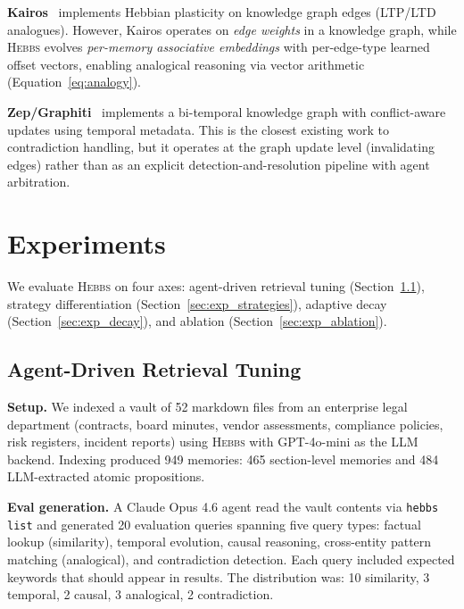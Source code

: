 \documentclass{article}
\begin{document}
\textbf{Kairos}~\citep{kairos} implements Hebbian plasticity on knowledge graph edges (LTP/LTD analogues). However, Kairos operates on \emph{edge weights} in a knowledge graph, while \textsc{Hebbs} evolves \emph{per-memory associative embeddings} with per-edge-type learned offset vectors, enabling analogical reasoning via vector arithmetic (Equation~\ref{eq:analogy}).

\textbf{Zep/Graphiti}~\citep{zep} implements a bi-temporal knowledge graph with conflict-aware updates using temporal metadata. This is the closest existing work to contradiction handling, but it operates at the graph update level (invalidating edges) rather than as an explicit detection-and-resolution pipeline with agent arbitration.

\section{Experiments}
\label{sec:experiments}

We evaluate \textsc{Hebbs} on four axes: agent-driven retrieval tuning (Section~\ref{sec:exp_tuning}), strategy differentiation (Section~\ref{sec:exp_strategies}), adaptive decay (Section~\ref{sec:exp_decay}), and ablation (Section~\ref{sec:exp_ablation}).

\subsection{Agent-Driven Retrieval Tuning}
\label{sec:exp_tuning}

\textbf{Setup.} We indexed a vault of 52 markdown files from an enterprise legal department (contracts, board minutes, vendor assessments, compliance policies, risk registers, incident reports) using \textsc{Hebbs} with GPT-4o-mini as the LLM backend. Indexing produced 949 memories: 465 section-level memories and 484 LLM-extracted atomic propositions.

\textbf{Eval generation.} A Claude Opus 4.6 agent read the vault contents via \texttt{hebbs list} and generated 20 evaluation queries spanning five query types: factual lookup (similarity), temporal evolution, causal reasoning, cross-entity pattern matching (analogical), and contradiction detection. Each query included expected keywords that should appear in results. The distribution was: 10 similarity, 3 temporal, 2 causal, 3 analogical, 2 contradiction.
\end{document}
